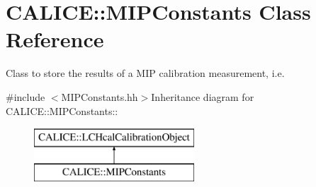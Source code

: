 \section{CALICE::MIPConstants Class Reference}
\label{classCALICE_1_1MIPConstants}


Class to store the results of a MIP calibration measurement, i.e.  


{\ttfamily \#include $<$MIPConstants.hh$>$}Inheritance diagram for CALICE::MIPConstants::\begin{figure}[H]
\begin{center}
\leavevmode
\includegraphics[height=2cm]{classCALICE_1_1MIPConstants}
\end{center}
\end{figure}

